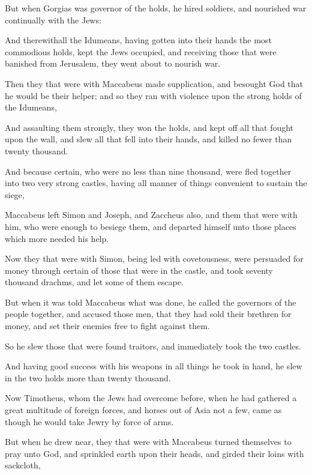 {\par }{\PP {}But when Gorgias was governor of the holds, he hired soldiers, and nourished war continually with the Jews:
\par }{\PP {}And therewithall the Idumeans, having gotten into their hands the most commodious holds, kept the Jews occupied, and receiving those that were banished from Jerusalem, they went about to nourish war.
\par }{\PP {}Then they that were with Maccabeus made supplication, and besought God that he would be their helper; and so they ran with violence upon the strong holds of the Idumeans,
\par }{\PP {}And assaulting them strongly, they won the holds, and kept off all that fought upon the wall, and slew all that fell into their hands, and killed no fewer than twenty thousand.
\par }{\PP {}And because certain, who were no less than nine thousand, were fled together into two very strong castles, having all manner of things convenient to sustain the siege,
\par }{\PP {}Maccabeus left Simon and Joseph, and Zaccheus also, and them that were with him, who were enough to besiege them, and departed himself unto those places which more needed his help.
\par }{\PP {}Now they that were with Simon, being led with covetousness, were persuaded for money through certain of those that were in the castle, and took seventy thousand drachms, and let some of them escape.
\par }{\PP {}But when it was told Maccabeus what was done, he called the governors of the people together, and accused those men, that they had sold their brethren for money, and set their enemies free to fight against them.
\par }{\PP {}So he slew those that were found traitors, and immediately took the two castles.
\par }{\PP {}And having good success with his weapons in all things he took in hand, he slew in the two holds more than twenty thousand.
\par }{\PP {}Now Timotheus, whom the Jews had overcome before, when he had gathered a great multitude of foreign forces, and horses out of Asia not a few, came as though he would take Jewry by force of arms.
\par }{\PP {}But when he drew near, they that were with Maccabeus turned themselves to pray unto God, and sprinkled earth upon their heads, and girded their loins with sackcloth,
}
